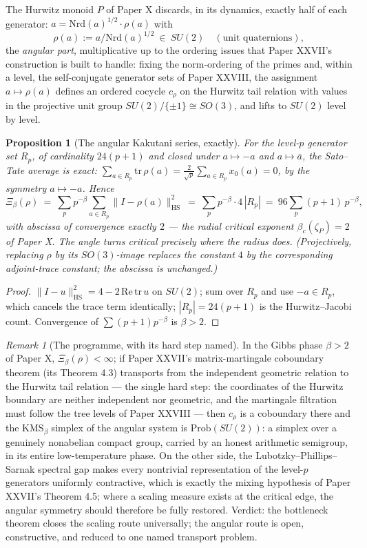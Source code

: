 \documentclass[11pt]{amsart}
\newtheorem{proposition}[theorem]{Proposition}
\theoremstyle{remark}
\newtheorem{remark}[theorem]{Remark}
\newcommand{\Prob}{\mathrm{Prob}}
\newcommand{\Nrd}{\mathrm{Nrd}}
\newcommand{\HS}{\mathrm{HS}}
\begin{document}
The Hurwitz monoid $P$ of Paper X discards, in its dynamics, exactly half of each
generator: $a=\Nrd(a)^{1/2}\cdot\rho(a)$ with
\[
\rho(a):=a/\Nrd(a)^{1/2}\ \in\ SU(2)\quad(\text{unit quaternions}),
\]
the \emph{angular part}, multiplicative up to the ordering issues that Paper XXVII's
construction is built to handle: fixing the norm-ordering of the primes and, within a
level, the self-conjugate generator sets of Paper XXVIII, the assignment
$a\mapsto\rho(a)$ defines an ordered cocycle $c_\rho$ on the Hurwitz tail relation with
values in the projective unit group $SU(2)/\{\pm1\}\cong SO(3)$, and lifts to $SU(2)$
level by level.

\begin{proposition}[The angular Kakutani series, exactly]\label{prop:angular}
For the level-$p$ generator set $R_p$, of cardinality $24(p{+}1)$ and closed under
$a\mapsto-a$ and $a\mapsto\bar a$, the Sato--Tate average is exact:
$\sum_{a\in R_p}\mathrm{tr}\,\rho(a)=\frac{2}{\sqrt p}\sum_{a\in R_p}x_0(a)=0$, by the
symmetry $a\mapsto-a$. Hence
\[
\Xi_\beta(\rho)\ =\ \sum_p p^{-\beta}\sum_{a\in R_p}\bigl\|I-\rho(a)\bigr\|_{\HS}^2
\ =\ \sum_p p^{-\beta}\cdot 4\,|R_p|
\ =\ 96\sum_p(p{+}1)\,p^{-\beta},
\]
with abscissa of convergence exactly $2$ --- the radial critical exponent
$\beta_c(\zeta_P)=2$ of Paper X. The angle turns critical precisely where the radius
does. (Projectively, replacing $\rho$ by its $SO(3)$-image replaces the constant $4$ by
the corresponding adjoint-trace constant; the abscissa is unchanged.)
\end{proposition}

\begin{proof}
$\|I-u\|^2_{\HS}=4-2\,\mathrm{Re}\,\mathrm{tr}\,u$ on $SU(2)$; sum over $R_p$ and use
$-a\in R_p$, which cancels the trace term identically; $|R_p|=24(p{+}1)$ is the
Hurwitz--Jacobi count. Convergence of $\sum(p{+}1)p^{-\beta}$ is $\beta>2$.
\end{proof}

\begin{remark}[The programme, with its hard step named]\label{rem:programme}
In the Gibbs phase $\beta>2$ of Paper X, $\Xi_\beta(\rho)<\infty$; if Paper XXVII's
matrix-martingale coboundary theorem (its Theorem 4.3) transports from the independent
geometric relation to the Hurwitz tail relation --- the single hard step: the
coordinates of the Hurwitz boundary are neither independent nor geometric, and the
martingale filtration must follow the tree levels of Paper XXVIII --- then $c_\rho$ is a
coboundary there and the KMS$_\beta$ simplex of the angular system is
$\Prob(SU(2))$: a simplex over a genuinely nonabelian compact group, carried by an
honest arithmetic semigroup, in its entire low-temperature phase. On the other side, the
Lubotzky--Phillips--Sarnak spectral gap \cite{LPS} makes every nontrivial representation
of the level-$p$ generators uniformly contractive, which is exactly the mixing hypothesis
of Paper XXVII's Theorem 4.5; where a scaling measure exists at the critical edge, the
angular symmetry should therefore be fully restored. Verdict: the bottleneck theorem
closes the scaling route universally; the angular route is open, constructive, and
reduced to one named transport problem.
\end{remark}
\end{document}
